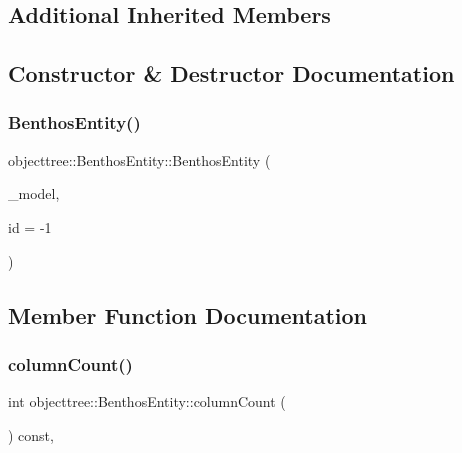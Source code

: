 \subsection*{Additional Inherited Members}


\subsection{Constructor \& Destructor Documentation}
\mbox{\label{classobjecttree_1_1_benthos_entity_aa4d443076fea7fe9a028bb90c8dfa49a}} 
\subsubsection{\texorpdfstring{BenthosEntity()}{BenthosEntity()}}
{\footnotesize\ttfamily objecttree\+::\+Benthos\+Entity\+::\+Benthos\+Entity (\begin{DoxyParamCaption}\item[{\mbox{\hyperlink{class_object_tree_model}{Object\+Tree\+Model}} $\ast$}]{\+\_\+model,  }\item[{int}]{id = {\ttfamily -\/1} }\end{DoxyParamCaption})}



\subsection{Member Function Documentation}
\mbox{\label{classobjecttree_1_1_benthos_entity_a2761ad58185c249be3c9419a0373cbe5}} 
\subsubsection{\texorpdfstring{columnCount()}{columnCount()}}
{\footnotesize\ttfamily int objecttree\+::\+Benthos\+Entity\+::column\+Count (\begin{DoxyParamCaption}{ }\end{DoxyParamCaption}) const\hspace{0.3cm}{\ttfamily [override]}, {\ttfamily [virtual]}}




